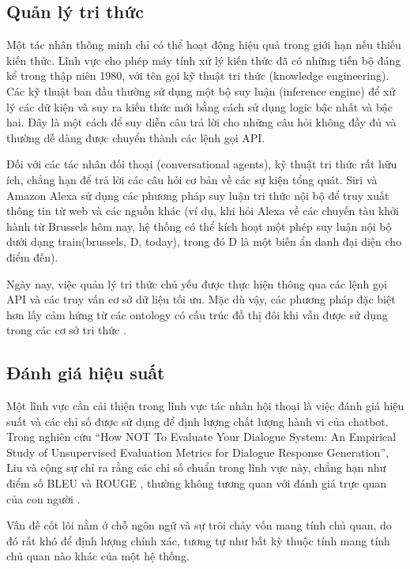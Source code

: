 \subsection{Quản lý tri thức}
\label{subsection:knowledge_management}


Một tác nhân thông minh chỉ có thể hoạt động hiệu quả trong giới hạn nếu thiếu kiến thức. Lĩnh vực cho phép máy tính xử lý kiến thức đã có những tiến bộ đáng kể trong thập niên 1980, với tên gọi kỹ thuật tri thức (knowledge engineering). Các kỹ thuật ban đầu thường sử dụng một bộ suy luận (inference engine) để xử lý các dữ kiện và suy ra kiến thức mới bằng cách sử dụng logic bậc nhất và bậc hai. Đây là một cách để suy diễn câu trả lời cho những câu hỏi không đầy đủ và thường dễ dàng được chuyển thành các lệnh gọi API.


Đối với các tác nhân đối thoại (conversational agents), kỹ thuật tri thức rất hữu ích, chẳng hạn để trả lời các câu hỏi cơ bản về các sự kiện tổng quát. Siri và Amazon Alexa sử dụng các phương pháp suy luận tri thức nội bộ để truy xuất thông tin từ web và các nguồn khác (ví dụ, khi hỏi Alexa về các chuyến tàu khởi hành từ Brussels hôm nay, hệ thống có thể kích hoạt một phép suy luận nội bộ dưới dạng train(brussels, D, today), trong đó D là một biến ẩn danh đại diện cho điểm đến).


Ngày nay, việc quản lý tri thức chủ yếu được thực hiện thông qua các lệnh gọi API và các truy vấn cơ sở dữ liệu tối ưu. Mặc dù vậy, các phương pháp đặc biệt hơn lấy cảm hứng từ các ontology có cấu trúc đồ thị đôi khi vẫn được sử dụng trong các cơ sở tri thức \cite{li2024matching}.


\subsection{Đánh giá hiệu suất}
\label{subsection:performance_assessment}


Một lĩnh vực cần cải thiện trong lĩnh vực tác nhân hội thoại là việc đánh giá hiệu suất và các chỉ số được sử dụng để định lượng chất lượng hành vi của chatbot. Trong nghiên cứu “How NOT To Evaluate Your Dialogue System: An Empirical Study of Unsupervised Evaluation Metrics for Dialogue Response Generation”, Liu và cộng sự chỉ ra rằng các chỉ số chuẩn trong lĩnh vực này, chẳng hạn như điểm số BLEU \cite{karpukhin2020dense} và ROUGE \cite{burges2005learning}, thường không tương quan với đánh giá trực quan của con người \cite{robertson2009probabilistic}.


Vấn đề cốt lõi nằm ở chỗ ngôn ngữ và sự trôi chảy vốn mang tính chủ quan, do đó rất khó để định lượng chính xác, tương tự như bất kỳ thuộc tính mang tính chủ quan nào khác của một hệ thống.


